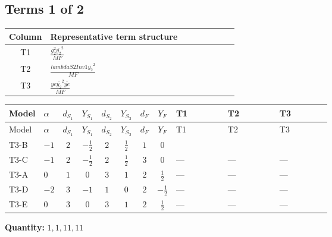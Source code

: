 \documentclass[8pt]{article}
\begin{document}
\begin{landscape}
\subsection*{Terms 1 of 2}
\begin{center}
\begin{tabular}{@{}c >{\raggedright\arraybackslash}p{0.82\linewidth}@{}}
\toprule
Column & Representative term structure \\
\midrule
T1 & \(\displaystyle \frac{g_{2}^{2} \overline{y_{2}}^{2}}{MF}\) \\
\midrule
T2 & \(\displaystyle \frac{lambdaS2Inv1 \overline{y_{2}}^{2}}{MF}\) \\
\midrule
T3 & \(\displaystyle \frac{ye \overline{y_{2}}^{2} \overline{ye}}{MF}\) \\
\midrule
\bottomrule
\end{tabular}
\end{center}
\smallskip
\tiny
\begin{longtable}{@{}llcccccc >{\raggedright\arraybackslash}p{0.21\linewidth} >{\raggedright\arraybackslash}p{0.21\linewidth} >{\raggedright\arraybackslash}p{0.21\linewidth}@{}}
\toprule
Model & $\alpha$ & $d_{S_1}$ & $Y_{S_1}$ & $d_{S_2}$ & $Y_{S_2}$ & $d_F$ & $Y_F$ & T1 & T2 & T3 \\
\midrule
\endfirsthead
\toprule
Model & $\alpha$ & $d_{S_1}$ & $Y_{S_1}$ & $d_{S_2}$ & $Y_{S_2}$ & $d_F$ & $Y_F$ & T1 & T2 & T3 \\
\midrule
\endhead
T3-B & $-1$ & $2$ & $-\frac{1}{2}$ & $2$ & $\frac{1}{2}$ & $1$ & $0$ & \scriptsize\adjustbox{max width=\linewidth}{$\begin{gathered} - \frac{3 g_{2}^{2} \overline{y_{2}}^{2}}{4 MF}\end{gathered}$} & \scriptsize\adjustbox{max width=\linewidth}{$\begin{gathered} - \frac{lambdaS2Inv1 \overline{y_{2}}^{2}}{2 MF}\end{gathered}$} & \scriptsize\adjustbox{max width=\linewidth}{$\begin{gathered} \frac{ye \overline{y_{2}}^{2} \overline{ye}}{4 MF}\end{gathered}$} \\
\midrule
T3-C & $-1$ & $2$ & $-\frac{1}{2}$ & $2$ & $\frac{1}{2}$ & $3$ & $0$ & --- & --- & --- \\
\midrule
T3-A & $0$ & $1$ & $0$ & $3$ & $1$ & $2$ & $\frac{1}{2}$ & --- & --- & --- \\
\midrule
T3-D & $-2$ & $3$ & $-1$ & $1$ & $0$ & $2$ & $-\frac{1}{2}$ & --- & --- & --- \\
\midrule
T3-E & $0$ & $3$ & $0$ & $3$ & $1$ & $2$ & $\frac{1}{2}$ & --- & --- & --- \\
\midrule
\bottomrule
\end{longtable}
\clearpage
\noindent\textbf{Quantity: }$\mathrm{1,1,11,11}$\par\smallskip

\end{landscape}
\end{document}
